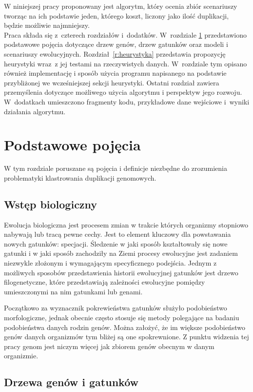\documentclass[licencjacka]{pracamgr}
\begin{document}
W niniejszej pracy proponowany jest algorytm, który ocenia zbiór scenariuszy tworząc na ich podstawie jeden, którego koszt, liczony jako ilość duplikacji, będzie możliwie najmniejszy.
\\
Praca składa się z~czterech rozdziałów i~dodatków.
W~rozdziale \ref{r:pojecia} przedstawiono podstawowe pojęcia dotyczące drzew genów, drzew gatunków oraz modeli i scenariuszy ewolucyjnych.  
Rozdział~\ref{r:heurystyka} przedstawia propozycję heurystyki wraz~z jej testami na rzeczywistych danych.  W~rozdziale tym opisano również implementację i sposób użycia programu napisanego na podstawie przybliżonej we wcześniejszej sekcji heurystyki.
Ostatni rozdział zawiera przemyślenia dotyczące możliwego użycia algorytmu i perspektyw jego rozwoju. W~dodatkach umieszczono fragmenty kodu, przykładowe dane wejściowe i~wyniki działania algorytmu.

\chapter{Podstawowe pojęcia}\label{r:pojecia}

W tym rozdziale poruszane są pojęcia i definicje niezbędne do zrozumienia problematyki klastrowania duplikacji genomowych. 
\section{Wstęp biologiczny}

Ewolucja biologiczna jest procesem zmian w trakcie których organizmy stopniowo nabywają lub tracą pewne cechy. Jest to element kluczowy dla powstawania nowych gatunków: specjacji. Śledzenie w jaki sposób kształtowały się nowe gatunki i w jaki sposób zachodziły na Ziemi procesy ewolucyjne jest zadaniem niezwykle złożonym i wymagającym specyficznego podejścia. Jednym z możliwych sposobów przedstawienia historii ewolucyjnej gatunków jest drzewo filogenetyczne, które przedstawiają zależności ewolucyjne pomiędzy umieszczonymi na nim gatunkami lub genami. 

Początkowo za wyznacznik pokrewieństwa gatunków służyło podobieństwo morfologiczne, jednak obecnie często stosuje się metody polegające na badaniu podobieństwa danych rodzin genów. Można założyć, że im większe podobieństwo genów danych organizmów tym bliżej są one spokrewnione. Z punktu widzenia tej pracy genom jest niczym więcej jak zbiorem genów obecnym w danym organizmie. 


\section{Drzewa genów i gatunków}
\end{document}
